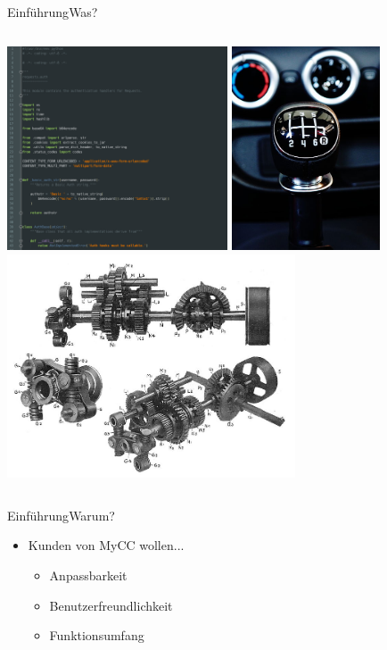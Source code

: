 \documentclass[t,aspectratio=169,divpsnames]{beamer}
\begin{document}
\begin{frame}{Einführung}{Was?}
\begin{columns}
\begin{column}{0.5\textwidth}
{				\includegraphics[width=0.49\textwidth]{img/SourceCode.png}
			}
			\only<4>
			{
				\center
				\includegraphics[width=0.33\textwidth]{img/GearShift.jpg}
				\includegraphics[width=0.64\textwidth]{img/GearShiftTechnical.jpg}
			}
		\end{column}
	\end{columns}
\end{frame}

\begin{frame}{Einführung}{Warum?}
	\begin{itemize}
		\item<1-> Kunden von MyCC wollen...
			\begin{itemize}
				\item<2-> Anpassbarkeit 
				\item<3-> Benutzerfreundlichkeit
				\item<4-> Funktionsumfang
			\end{itemize}
	\end{itemize}
\end{frame}
\end{document}
